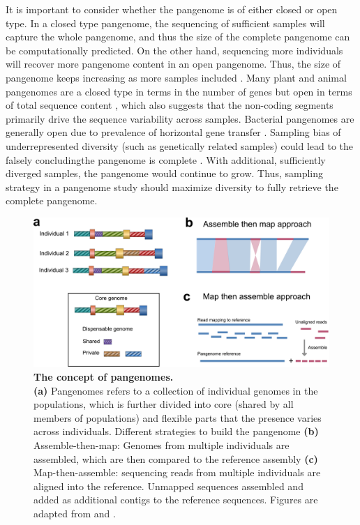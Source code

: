 \documentclass[../main.tex]{subfiles}
\begin{document}
It is important to consider whether the pangenome is of either closed or open type. In a closed type pangenome, the sequencing of sufficient samples will capture the whole pangenome, and thus the size of the complete pangenome can be computationally predicted. On the other hand, sequencing more individuals will recover more pangenome content in an open pangenome. Thus, the size of pangenome keeps increasing as more samples included \citep{golicz2020pangenomics}. Many plant and animal pangenomes are a closed type in terms in the number of genes but open in terms of total sequence content \citep{duan2019hupan,golicz2020pangenomics}, which also suggests that the non-coding segments primarily drive the sequence variability across samples. Bacterial pangenomes  are generally open due to prevalence of horizontal gene transfer \citep{soucy2015horizontal}. Sampling bias of underrepresented diversity (such as genetically related samples) could lead to the falsely concludingthe pangenome is complete \citep{tranchant2018plant}. With additional, sufficiently  diverged samples, the  pangenome would continue to grow. Thus, sampling strategy in a pangenome study should maximize diversity to fully retrieve the complete pangenome. 

\begin{figure}[!htb]
    \centering
    \includegraphics[width=\textwidth]{intro/fig3.pdf}
        \vspace{3mm}
        \caption[The concept of pangenomes]{\textbf{The concept of pangenomes.} \\
        \footnotesize{\textbf{(a)} Pangenomes refers to a collection of individual genomes in the populations, which is further divided into core (shared by all members of populations) and flexible parts that the presence varies across individuals. Different strategies to build the pangenome \textbf{(b)} Assemble-then-map: Genomes from multiple individuals are assembled, which are then compared to the reference assembly \textbf{(c)} Map-then-assemble: sequencing reads from multiple individuals are aligned into the reference. Unmapped sequences assembled and added as additional contigs to the reference sequences. Figures are adapted from \citep{sherman2020pan} and \citep{bayer2020plant}.}}
        \label{fig13:pan}
\end{figure}
\end{document}
